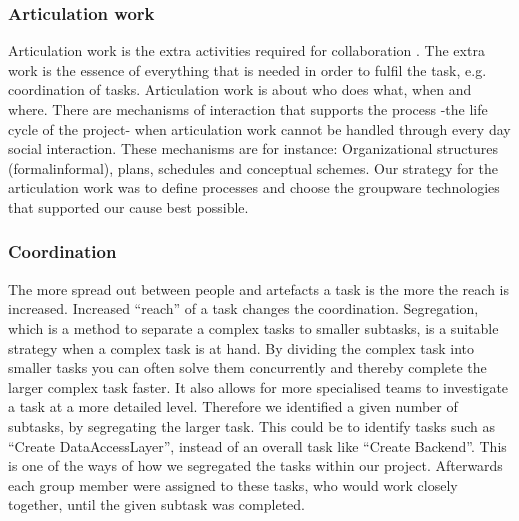 \subsubsection{Articulation work} \label{subsubsec:articulationwork}
Articulation work is the extra activities required for collaboration \cite{schmidt1992taking}. The extra work is the essence of everything that is needed in order to fulfil the task, e.g. coordination of tasks. Articulation work is about who does what, when and where. There are mechanisms of interaction that supports the process -the life cycle of the project- when articulation work cannot be handled through every day social interaction. These mechanisms are for instance: Organizational structures (formal\/informal), plans, schedules and conceptual schemes. 
Our strategy for the articulation work was to define processes and choose the groupware technologies that supported our cause best possible.

\subsubsection{Coordination} \label{subsubsec:coordination}
The more spread out between people and artefacts a task is the more the reach is increased. Increased ``reach'' of a task changes the coordination. Segregation, which is a method to separate a complex tasks to smaller subtasks, is a suitable strategy when a complex task is at hand. By dividing the complex task into smaller tasks you can often solve them concurrently and thereby complete the larger complex task faster. It also allows for more specialised teams to investigate a task at a more detailed level. Therefore we identified a given number of subtasks, by segregating the larger task. This could be to identify tasks such as ``Create DataAccessLayer'', instead of an overall task like ``Create Backend''. This is one of the ways of how we segregated the tasks within our project. Afterwards each group member were assigned to these tasks, who would work closely together, until the given subtask was completed.


